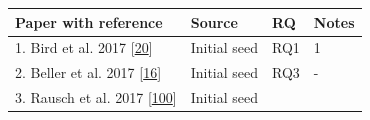 \documentclass[]{book}
\begin{document}
\begin{longtable}[]{@{}llll@{}}
\toprule
\begin{minipage}[b]{0.56\columnwidth}\raggedright\strut
Paper with reference\strut
\end{minipage} & \begin{minipage}[b]{0.18\columnwidth}\raggedright\strut
Source\strut
\end{minipage} & \begin{minipage}[b]{0.08\columnwidth}\raggedright\strut
RQ\strut
\end{minipage} & \begin{minipage}[b]{0.06\columnwidth}\raggedright\strut
Notes\strut
\end{minipage}\tabularnewline
\midrule
\endhead
\begin{minipage}[t]{0.56\columnwidth}\raggedright\strut
1. Bird et al. 2017
{[}\protect\hyperlink{ref-bird2017predicting}{20}{]}\strut
\end{minipage} & \begin{minipage}[t]{0.18\columnwidth}\raggedright\strut
Initial seed\strut
\end{minipage} & \begin{minipage}[t]{0.08\columnwidth}\raggedright\strut
RQ1\strut
\end{minipage} & \begin{minipage}[t]{0.06\columnwidth}\raggedright\strut
1\strut
\end{minipage}\tabularnewline
\begin{minipage}[t]{0.56\columnwidth}\raggedright\strut
2. Beller et al. 2017
{[}\protect\hyperlink{ref-beller2017oops}{16}{]}\strut
\end{minipage} & \begin{minipage}[t]{0.18\columnwidth}\raggedright\strut
Initial seed\strut
\end{minipage} & \begin{minipage}[t]{0.08\columnwidth}\raggedright\strut
RQ3\strut
\end{minipage} & \begin{minipage}[t]{0.06\columnwidth}\raggedright\strut
-\strut
\end{minipage}\tabularnewline
\begin{minipage}[t]{0.56\columnwidth}\raggedright\strut
3. Rausch et al. 2017
{[}\protect\hyperlink{ref-rausch2017empirical}{100}{]}\strut
\end{minipage} & \begin{minipage}[t]{0.18\columnwidth}\raggedright\strut
Initial seed\strut

\end{minipage}
\end{longtable}
\end{document}

